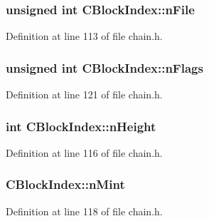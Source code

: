 \subsubsection[{n\+File}]{\setlength{\rightskip}{0pt plus 5cm}unsigned int C\+Block\+Index\+::n\+File}\label{class_c_block_index_a3bf9ecd8938c42be6a4b14d3c7ef5c21}


Definition at line 113 of file chain.\+h.

\hypertarget{class_c_block_index_a02aaba7d27ec615e6f9f740353d839de}{}
\subsubsection[{n\+Flags}]{\setlength{\rightskip}{0pt plus 5cm}unsigned int C\+Block\+Index\+::n\+Flags}\label{class_c_block_index_a02aaba7d27ec615e6f9f740353d839de}


Definition at line 121 of file chain.\+h.

\hypertarget{class_c_block_index_aebfc8d6b95852546760e742553d7bfd5}{}
\subsubsection[{n\+Height}]{\setlength{\rightskip}{0pt plus 5cm}int C\+Block\+Index\+::n\+Height}\label{class_c_block_index_aebfc8d6b95852546760e742553d7bfd5}


Definition at line 116 of file chain.\+h.

\hypertarget{class_c_block_index_a6559fddea3401548ae144e870d150359}{}
\subsubsection[{n\+Mint}]{ C\+Block\+Index\+::n\+Mint}\label{class_c_block_index_a6559fddea3401548ae144e870d150359}


Definition at line 118 of file chain.\+h.

\hypertarget{class_c_block_index_a309fdc44d871b336abe64eadf250cafd}{}
